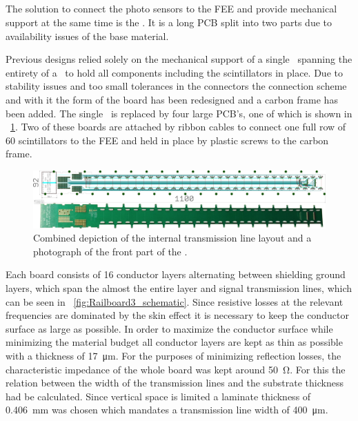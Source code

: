 \documentclass[../BTOF_summary.tex]{subfiles}
\begin{document}
\subsection{\railboard}

The solution to connect the photo sensors to the FEE and provide mechanical support at the same time is the \railboard .
It is a long PCB split into two parts due to availability issues of the base material.

Previous designs relied solely on the mechanical support of a single \railboard\ spanning the entirety of a \sm\ to hold all components including the scintillators in place.
Due to stability issues and too small tolerances in the connectors the connection scheme and with it the form of the board has been redesigned and a carbon frame has been added.
The single \railboard\ is replaced by four large PCB's, one of which is shown in \fig ~\ref{fig:Railboard}.
Two of these boards are attached by ribbon cables to connect one full row of 60 scintillators to the FEE and held in place by plastic screws to the carbon frame.

\begin{figure}[htbp]
	\centering
	\includegraphics*[width=.9\textwidth]{fig/Railboard3_imageCombined.png}
	\caption{Combined depiction of the internal transmission line layout and a photograph of the front part of the \railboard .}
	\label{fig:Railboard}
\end{figure}

Each board consists of 16 conductor layers alternating between shielding ground layers, which span the almost the entire layer and signal transmission lines, which can be seen in \fig ~\ref{fig:Railboard3_schematic}.
Since resistive losses at the relevant frequencies are dominated by the skin effect it is necessary to keep the conductor surface as large as possible.
In order to maximize the conductor surface while minimizing the material budget all conductor layers are kept as thin as possible with a thickness of \SI{17}{\micro \meter}.
For the purposes of minimizing reflection losses, the characteristic impedance of the whole board was kept around \SI{50}{\ohm}.
For this the relation between the width of the transmission lines and the substrate thickness had be calculated.
Since vertical space is limited a laminate thickness of \SI{0.406}{mm} was chosen which mandates a transmission line width of \SI{400}{\micro m}.
\end{document}
